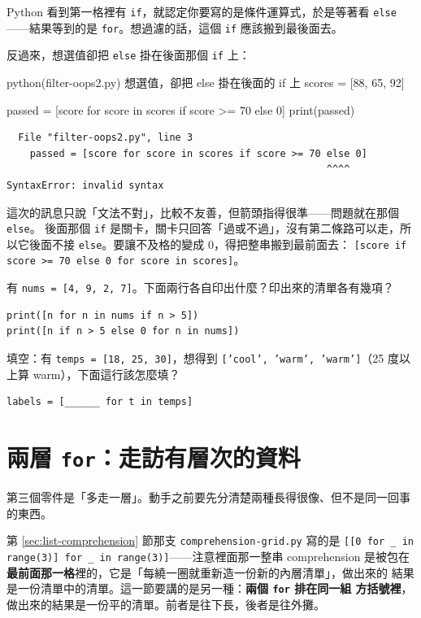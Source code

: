 Python 看到第一格裡有 \texttt{if}，就認定你要寫的是條件運算式，於是等著看 \texttt{else}
——結果等到的是 \texttt{for}。想過濾的話，這個 \texttt{if} 應該搬到最後面去。

反過來，想選值卻把 \texttt{else} 掛在後面那個 \texttt{if} 上：

\begin{example}{python}{(filter-oops2.py) 想選值，卻把 else 掛在後面的 if 上}
scores = [88, 65, 92]

passed = [score for score in scores if score >= 70 else 0]
print(passed)
\end{example}

\begin{verbatim}
  File "filter-oops2.py", line 3
    passed = [score for score in scores if score >= 70 else 0]
                                                       ^^^^
SyntaxError: invalid syntax
\end{verbatim}

這次的訊息只說「文法不對」，比較不友善，但箭頭指得很準——問題就在那個 \texttt{else}。
後面那個 \texttt{if} 是關卡，關卡只回答「過或不過」，沒有第二條路可以走，所以它後面不接
\texttt{else}。要讓不及格的變成 0，得把整串搬到最前面去：
\texttt{[score if score >= 70 else 0 for score in scores]}。

\begin{drills}[label=drills:conditional-expression]
\item 有 \texttt{nums = [4, 9, 2, 7]}。下面兩行各自印出什麼？印出來的清單各有幾項？
\begin{verbatim}
print([n for n in nums if n > 5])
print([n if n > 5 else 0 for n in nums])
\end{verbatim}
\item 填空：有 \texttt{temps = [18, 25, 30]}，想得到
\texttt{['cool', 'warm', 'warm']}（25 度以上算 warm），下面這行該怎麼填？
\begin{verbatim}
labels = [______ for t in temps]
\end{verbatim}
\end{drills}

\section{兩層 \texttt{for}：走訪有層次的資料}
\label{sec:comp-nested}

第三個零件是「多走一層」。動手之前要先分清楚兩種長得很像、但不是同一回事的東西。

第 \ref{sec:list-comprehension} 節那支 \texttt{comprehension-grid.py} 寫的是
\texttt{[[0 for \_ in range(3)] for \_ in range(3)]}——注意裡面那一整串 comprehension
是被包在\textbf{最前面那一格}裡的，它是「每繞一圈就重新造一份新的內層清單」，做出來的
結果是一份清單中的清單。這一節要講的是另一種：\textbf{兩個 \texttt{for} 排在同一組
方括號裡}，做出來的結果是一份平的清單。前者是往下長，後者是往外攤。

